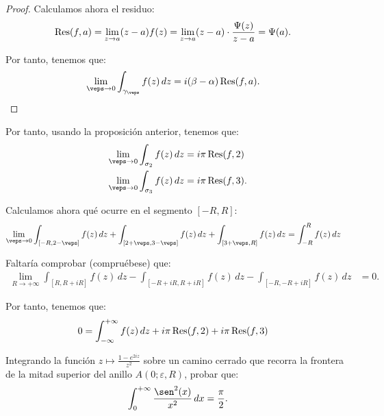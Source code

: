 \begin{ejercicio}
\begin{prop}
\begin{proof}
            Calculamos ahora el residuo:
            \begin{align*}
                \operatorname{Res}(f,a) &= \lim_{z\to a} (z-a)f(z) = \lim_{z\to a} (z-a)\cdot \frac{\Psi(z)}{z-a} = \Psi(a).
            \end{align*}

            Por tanto, tenemos que:
            \begin{align*}
                \lim_{\veps\to 0} \int_{\gamma_\veps} f(z) \, dz &= i(\beta - \alpha)\Res(f,a).
            \end{align*}
        \end{proof}
    \end{prop}

    Por tanto, usando la proposición anterior, tenemos que:
    \begin{align*}
        \lim_{\veps\to 0} \int_{\sigma_{2}} f(z) \, dz &= i\pi\Res(f,2)\\
        \lim_{\veps\to 0} \int_{\sigma_{3}} f(z) \, dz &= i\pi\Res(f,3).
    \end{align*}

    Calculamos ahora qué ocurre en el segmento $[-R,R]$:
    \begin{align*}
        \lim_{\veps\to 0} \int_{[-R, 2-\veps]} f(z) \, dz + \int_{[2+\veps, 3-\veps]} f(z) \, dz + \int_{[3+\veps, R]} f(z) \, dz &= \int_{-R}^{R} f(z) \, dz
    \end{align*}

    Faltaría comprobar (compruébese) que:
    \begin{align*}
        \lim_{R\to+\infty} \int_{[R, R+iR]} f(z) \, dz - \int_{[-R+iR, R+iR]} f(z) \, dz - \int_{[-R, -R+iR]} f(z) \, dz &= 0.
    \end{align*}

    Por tanto, tenemos que:
    \begin{align*}
        0 &= \int_{-\infty}^{+\infty} f(z) \, dz + i\pi\operatorname{Res}(f,2) + i\pi\operatorname{Res}(f,3)
    \end{align*}
\end{ejercicio}

\begin{ejercicio}
    Integrando la función $z \mapsto \frac{1-e^{2i z}}{z^2}$ sobre un camino cerrado que recorra la frontera de la mitad superior del anillo $A(0; \varepsilon, R)$, probar que:
    \begin{equation*}
        \int_0^{+\infty} \frac{\sen^2(x)}{x^2} \, dx = \frac{\pi}{2}.
    \end{equation*}
\end{ejercicio}

